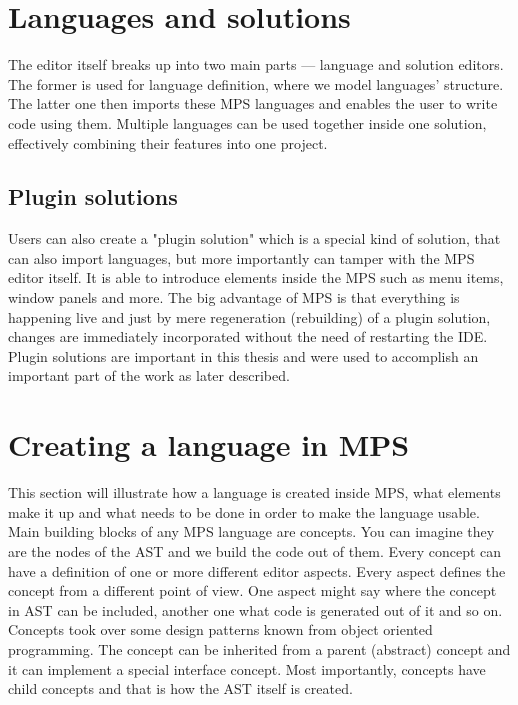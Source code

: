 \section{Languages and solutions}

The editor itself breaks up into two main parts --- language and solution editors.
The former is used for language definition, where we model languages' structure.
The latter one then imports these MPS languages and enables the user to write code using them.
Multiple languages can be used together inside one solution, effectively combining their features into one project.

\subsection{Plugin solutions}

Users can also create a "plugin solution" which is a special kind of solution, that can also import languages, but more importantly can tamper with the MPS editor itself.
It is able to introduce elements inside the MPS such as menu items, window panels and more.
The big advantage of MPS is that everything is happening live and just by mere regeneration (rebuilding) of a plugin solution, changes are immediately incorporated without the need of restarting the IDE.
Plugin solutions are important in this thesis and were used to accomplish an important part of the work as later described.

\section{Creating a language in MPS}

This section will illustrate how a language is created inside MPS, what elements make it up and what needs to be done in order to make the language usable.
\\

Main building blocks of any MPS language are concepts.
You can imagine they are the nodes of the AST and we build the code out of them.
Every concept can have a definition of one or more different editor aspects.
Every aspect defines the concept from a different point of view.
One aspect might say where the concept in AST can be included, another one what code is generated out of it and so on.
Concepts took over some design patterns known from object oriented programming.
The concept can be inherited from a parent (abstract) concept and it can implement a special interface concept.
Most importantly, concepts have child concepts and that is how the AST itself is created.
\\

